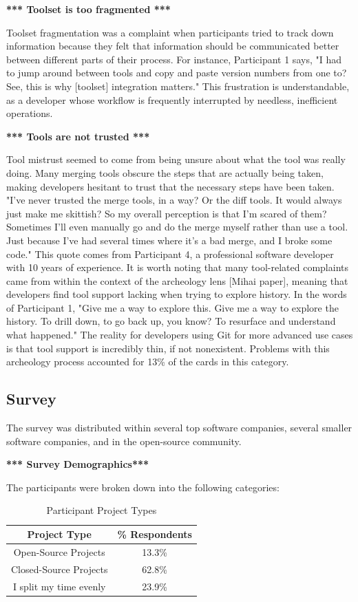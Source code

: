 \documentclass[conference]{IEEEtran}
\begin{document}
\textbf{*** Toolset is too fragmented ***}

Toolset fragmentation was a complaint when participants tried to track down information because they felt that information should be communicated better between different parts of their process. For instance, Participant 1 says, "I had to jump around between tools and copy and paste version numbers from one to? See, this is why [toolset] integration matters." This frustration is understandable, as a developer whose workflow is frequently interrupted by needless, inefficient operations.

\textbf{*** Tools are not trusted ***}

Tool mistrust seemed to come from being unsure about what the tool was really doing. Many merging tools obscure the steps that are actually being taken, making developers hesitant to trust that the necessary steps have been taken. "I've never trusted the merge tools, in a way? Or the diff tools. It would always just make me skittish? So my overall perception is that I'm scared of them? Sometimes I'll even manually go and do the merge myself rather than use a tool. Just because I've had several times where it's a bad merge, and I broke some code." This quote comes from Participant 4, a professional software developer with 10 years of experience. 
It is worth noting that many tool-related complaints came from within the context of the archeology lens [Mihai paper], meaning that developers find tool support lacking when trying to explore history. In the words of Participant 1, "Give me a way to explore this. Give me a way to explore the history. To drill down, to go back up, you know? To resurface and understand what happened." The reality for developers using Git for more advanced use cases is that tool support is incredibly thin, if not nonexistent. Problems with this archeology process accounted for 13\% of the cards in this category.

\subsection{Survey}

The survey was distributed within several top software companies, several smaller software companies, and in the open-source community.

\textbf{*** Survey Demographics***}

The participants were broken down into the following categories:

\begin{table}[!t]
\renewcommand{\arraystretch}{1.3}
\caption{Participant Project Types}
\label{project_type}
\centering
\begin{tabular}{|c||c|}
\hline
Project Type & \% Respondents\\
\hline
Open-Source Projects & 13.3\%\\
Closed-Source Projects & 62.8\%\\
I split my time evenly & 23.9\%\\
\hline
\end{tabular}
\end{table}
\end{document}
